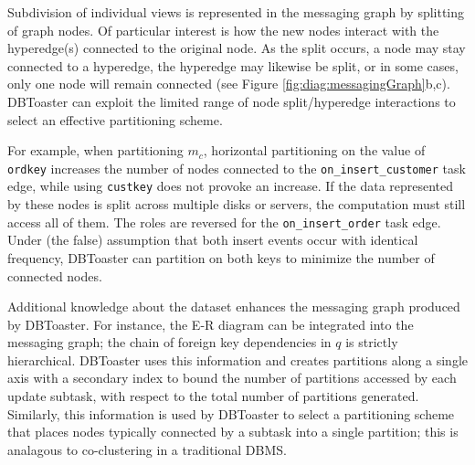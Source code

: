 Subdivision of individual views is represented in the messaging graph by splitting of graph nodes.  Of particular interest is how the new nodes interact with the hyperedge(s) connected to the original node.  As the split occurs, a node may stay connected to a hyperedge, the hyperedge may likewise be split, or in some cases, only one node will remain connected (see Figure \ref{fig:diag:messagingGraph}b,c).  DBToaster can exploit the limited range of node split/hyperedge interactions to select an effective partitioning scheme.

For example, when partitioning $m_c$, horizontal partitioning on the value of \texttt{ordkey} increases the number of nodes connected to the \texttt{on\_insert\_customer} task edge, while using \texttt{custkey} does not provoke an increase.  If the data represented by these nodes is split across multiple disks or servers, the computation must still access all of them.  The roles are reversed for the \texttt{on\_insert\_order} task edge.  Under (the false) assumption that both insert events occur with identical frequency, DBToaster can partition on both keys to minimize the number of connected nodes.

Additional knowledge about the dataset enhances the messaging graph produced by DBToaster.  For instance, the E-R diagram can be integrated into the messaging graph; the chain of foreign key dependencies in $q$ is strictly hierarchical.  DBToaster uses this information and creates partitions along a single axis with a secondary index to bound the number of partitions accessed by each update subtask, with respect to the total number of partitions generated.  Similarly, this information is used by DBToaster to select a partitioning scheme that places nodes typically connected by a subtask into a single partition; this is analagous to co-clustering in a traditional DBMS.
